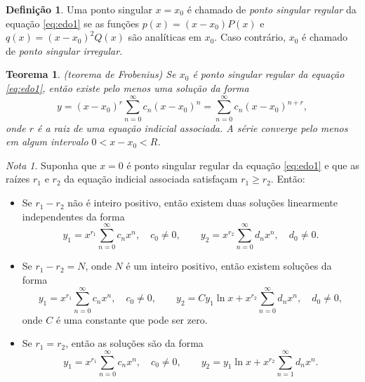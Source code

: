\documentclass[12pt]{article}
\theoremstyle{plain}
\newtheorem{thm}{Teorema}[section]
\theoremstyle{definition}
\newtheorem{defn}{Definição}[section]
\theoremstyle{remark}
\newtheorem*{rem}{Nota}
\begin{document}
\begin{defn}
    Uma ponto singular \(x=x_0\) é chamado de \emph{ponto singular regular} da equação \eqref{eq:edo1} se as funções \(p(x)=(x-x_0)P(x)\) e \(q(x)=(x-x_0)^2Q(x)\) são analíticas em \(x_0\). Caso contrário, \(x_0\) é chamado de \emph{ponto singular irregular}.
\end{defn}

\begin{thm} (teorema de Frobenius)
    Se \(x_0\) é ponto singular regular da equação \eqref{eq:edo1}, então existe pelo menos uma solução da forma
    \begin{equation}
        y = (x - x_0)^r \sum_{n=0}^{\infty} c_n (x - x_0)^n = \sum_{n=0}^{\infty} c_n (x - x_0)^{n+r},
    \end{equation}
    \noindent onde \(r\) é a raiz de uma equação indicial associada. A série converge pelo menos em algum intervalo \(0<x-x_0<R\).
\end{thm}

\begin{rem}
    Suponha que \(x=0\) é ponto singular regular da equação \eqref{eq:edo1} e que as raízes \(r_1\) e \(r_2\) da equação indicial associada satisfaçam \(r_1 \geq r_2\). Então:
    \begin{itemize}
        \item [\textbf{Caso I.}] Se \(r_1 - r_2\) não é inteiro positivo, então existem duas soluções linearmente independentes da forma
        \begin{equation}
            y_1 = x^{r_1} \sum_{n=0}^{\infty} c_n x^n, \quad c_0 \neq 0, \qquad y_2 = x^{r_2} \sum_{n=0}^{\infty} d_n x^n, \quad d_0 \neq 0.
        \end{equation}
        \item [\textbf{Caso II.}] Se \(r_1 - r_2 = N\), onde \(N\) é um inteiro positivo, então existem soluções da forma
        \begin{equation}
            y_1 = x^{r_1} \sum_{n=0}^{\infty} c_n x^n, \quad c_0 \neq 0, \qquad y_2 = C y_1 \ln x + x^{r_2} \sum_{n=0}^{\infty} d_n x^n, \quad d_0 \neq 0,
        \end{equation}
        \noindent onde \(C\) é uma constante que pode ser zero.
        \item [\textbf{Caso III.}] Se \(r_1 = r_2\), então as soluções são da forma
        \begin{equation}
            y_1 = x^{r_1} \sum_{n=0}^{\infty} c_n x^n, \quad c_0 \neq 0, \qquad y_2 = y_1 \ln x + x^{r_2} \sum_{n=1}^{\infty} d_n x^n.
        \end{equation}
    \end{itemize}
\end{rem}
\end{document}
